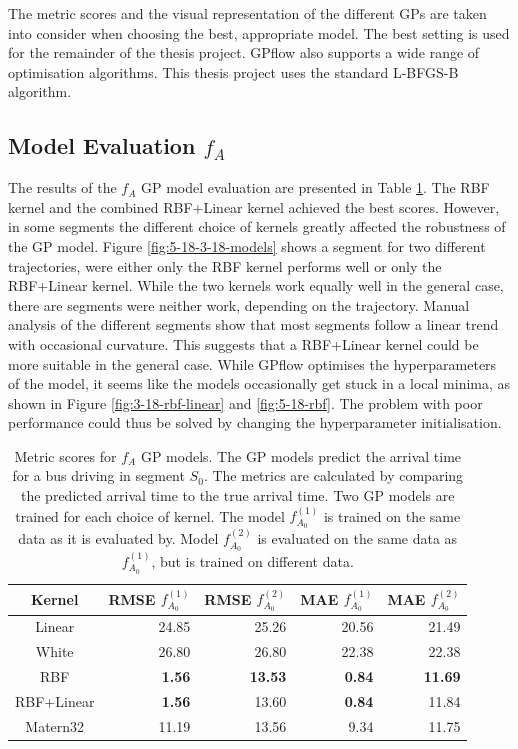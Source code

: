 The metric scores and the visual representation of the different GPs are taken into consider when choosing the best, appropriate model.
The best setting is used for the remainder of the thesis project.
GPflow also supports a wide range of optimisation algorithms.
This thesis project uses the standard L-BFGS-B algorithm.

\subsection{Model Evaluation $f_A$}
The results of the $f_A$ GP model evaluation are presented in Table \ref{table:metric-scores}.
The RBF kernel and the combined RBF+Linear kernel achieved the best scores.
However, in some segments the different choice of kernels greatly affected the robustness of the GP model.
Figure \ref{fig:5-18-3-18-models} shows a segment for two different trajectories, were either only the RBF kernel performs well or only the RBF+Linear kernel.
While the two kernels work equally well in the general case, there are segments were neither work, depending on the trajectory.
Manual analysis of the different segments show that most segments follow a linear trend with occasional curvature.
This suggests that a RBF+Linear kernel could be more suitable in the general case. 
While GPflow optimises the hyperparameters of the model, it seems like the models occasionally get stuck in a local minima, as shown in Figure \ref{fig:3-18-rbf-linear} and \ref{fig:5-18-rbf}.
The problem with poor performance could thus be solved by changing the hyperparameter initialisation.

\begin{table}
    \centering
    \caption[Metric scores for $f_A$ GP models]%
    {{\small Metric scores for $f_A$ GP models.
    The GP models predict the arrival time for a bus driving in segment $S_0$.
    The metrics are calculated by comparing the predicted arrival time to the true arrival time. 
    Two GP models are trained for each choice of kernel. 
    The model $f^{(1)}_{A_0}$ is trained on the same data as it is evaluated by.
    Model $f^{(2)}_{A_0}$ is evaluated on the same data as $f^{(1)}_{A_0}$, but is trained on different data.}}
    \label{table:metric-scores} 
    \begin{tabular}{ |c|r|r|r|r| } 
        \hline
        Kernel & RMSE $f^{(1)}_{A_0}$ & RMSE $f^{(2)}_{A_0}$ & MAE $f^{(1)}_{A_0}$ & MAE $f^{(2)}_{A_0}$ \\ [0.5ex] 
        \hline
        Linear & 24.85 & 25.26 & 20.56 & 21.49 \\
        White & 26.80 & 26.80 & 22.38 & 22.38 \\
        RBF & \textbf{1.56} & \textbf{13.53} & \textbf{0.84} & \textbf{11.69} \\
        RBF+Linear & \textbf{1.56} & 13.60 & \textbf{0.84} & 11.84 \\
        Matern32 & 11.19 & 13.56 & 9.34 & 11.75 \\
        \hline
    \end{tabular}
\end{table}

